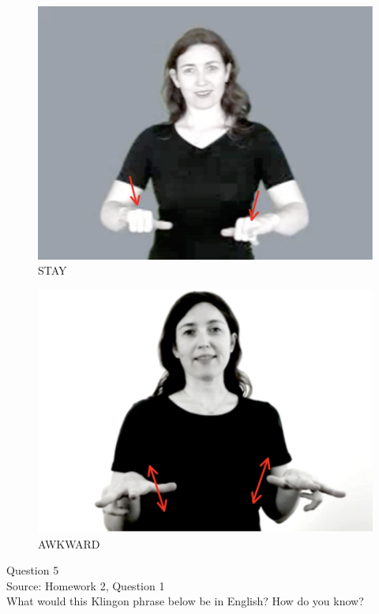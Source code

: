 \documentclass[12pt]{article}
\begin{document}
\begin{figure}[H]
\includegraphics{../images/asl_stay.png}
\caption{STAY}
\end{figure}
\begin{figure}[H]
\includegraphics{../images/asl_awkward.png}
\caption{AWKWARD}
\end{figure}

\newpage

{\large Question 5}\\

Source: Homework 2, Question 1\\

What would this Klingon phrase below be in English? How do you know?\\
\end{document}
